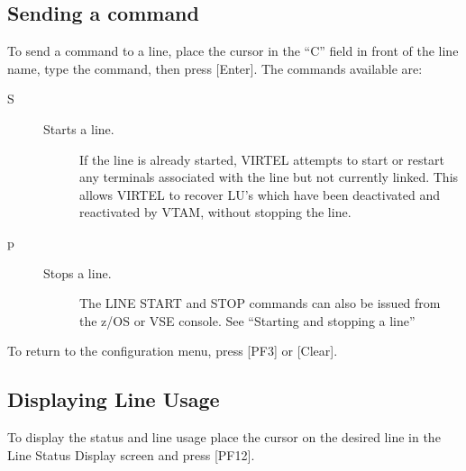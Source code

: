 \documentclass[letterpaper,10pt,english]{sphinxmanual}
\begin{document}
\ignorespaces 

\subsection{Sending a command}
\label{\detokenize{audit_operations_ and_performance:sending-a-command}}\label{\detokenize{audit_operations_ and_performance:index-38}}
To send a command to a line, place the cursor in the “C” field in front of the line name, type the command, then press {[}Enter{]}. The  commands available are:
\begin{description}
\item[{S}] \leavevmode\begin{description}
\item[{Starts a line.}] \leavevmode
If the line is already started, VIRTEL attempts to start or restart any terminals associated with the line but not currently linked. This allows VIRTEL to recover LU’s which have been     deactivated and reactivated by VTAM, without stopping the line.

\end{description}

\item[{p}] \leavevmode\begin{description}
\item[{Stops a line.}] \leavevmode
The LINE START and STOP commands can also be issued from the z/OS or VSE console. See “Starting and stopping a line”

\end{description}

\end{description}

To return to the configuration menu, press {[}PF3{]} or {[}Clear{]}.

\ignorespaces 

\subsection{Displaying Line Usage}
\label{\detokenize{audit_operations_ and_performance:displaying-line-usage}}\label{\detokenize{audit_operations_ and_performance:index-39}}
To display the status and line usage place the cursor on the desired line in the Line Status Display screen and press {[}PF12{]}.
\end{document}
